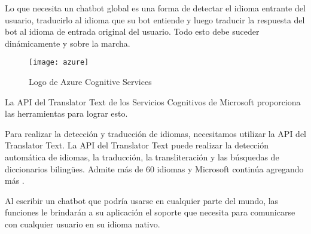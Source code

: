 Lo que necesita un chatbot global es una forma de detectar el idioma entrante del usuario, traducirlo al idioma que su bot entiende y luego traducir la respuesta del bot al idioma de entrada original del usuario. Todo esto debe suceder dinámicamente y sobre la marcha.

\begin{figure}[htp!]
  \centering
  \texttt{[image: azure]}
  \caption{Logo de Azure Cognitive Services}
  \label{fig:azure}
\end{figure}

La API del Translator Text de los Servicios Cognitivos de Microsoft proporciona las herramientas para lograr esto.

Para realizar la detección y traducción de idiomas, necesitamos utilizar la API del Translator Text. La API del Translator Text puede realizar la detección automática de idiomas, la traducción, la transliteración y las búsquedas de diccionarios bilingües. Admite más de 60 idiomas y Microsoft continúa agregando más \cite{chatbot4}.

Al escribir un chatbot que podría usarse en cualquier parte del mundo, las funciones le brindarán a su aplicación el soporte que necesita para comunicarse con cualquier usuario en su idioma nativo.
